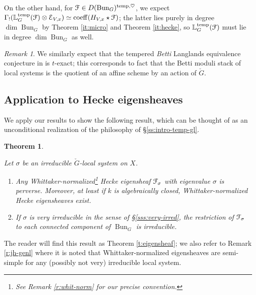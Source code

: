 \documentclass[reqno,11pt]{amsart}
\numberwithin{equation}{subsection}
\newtheorem{introthm}{Theorem}
\theoremstyle{remark}
\newtheorem{rem}[thm]{Remark}
\newcommand{\bL}{{\mathbb L}}
\newcommand{\sE}{{\EuScript E}}
\newcommand{\sF}{{\EuScript F}}
\newcommand{\on}{\operatorname}
\newcommand{\Bun}{\on{Bun}}
\newcommand{\heart}{\heartsuit}
\newcommand{\coeff}{\on{coeff}}
\newcommand{\temp}{\on{temp}}
\begin{document}
On the other hand, for $\sF \in D(\Bun_G)^{\temp,\heart}$,
we expect $\Gamma_!(\bL_G^{\temp}(\sF) \otimes \sE_{V,x})
\simeq \coeff(H_{V,x} \star \sF)$; the latter lies purely
in degree $\dim \Bun_G$ by Theorem \ref{it:micro} and
Theorem \ref{it:hecke}, so $\bL_G^{\temp}(\sF)$ must 
lie in degree $\dim \Bun_G$ as well. 

\begin{rem}

We similarly expect that the tempered \emph{Betti} Langlands
equivalence conjecture in \cite{bz-n-betti-gl} is $t$-exact;
this corresponds to fact that the Betti moduli stack of
local systems is the quotient of an affine scheme by 
an action of $\check{G}$. 

\end{rem}

\subsection{Application to Hecke eigensheaves}

We apply our results to show the following result, which can be
thought of as an unconditional realization of the philosophy of 
\S \ref{ss:intro-temp-gl}.

\begin{introthm}\label{it:eigensheaf}

Let $\sigma$ be an irreducible $\check{G}$-local system on $X$.

\begin{enumerate}

\item Any Whittaker-normalized\footnote{See Remark \ref{r:whit-norm} for our
precise convention.}
Hecke eigensheaf $\sF_{\sigma}$ with
eigenvalue $\sigma$ is perverse. Moreover, at least if $k$ is algebraically
closed, Whittaker-normalized Hecke eigensheaves exist.

\item If $\sigma$ is \emph{very irreducible} in the sense of \S \ref{sss:very-irred},
the restriction of $\sF_{\sigma}$ to each connected component of $\Bun_G$
is irreducible.

\end{enumerate}

\end{introthm}

The reader will find this result as Theorem \ref{t:eigensheaf}; we also
refer to Remark \ref{r:jh-genl} where it is noted that Whittaker-normalized
eigensheaves are semi-simple for any (possibly not very) irreducible local system.
\end{document}
